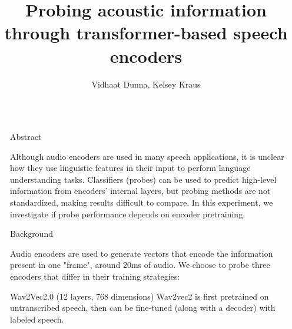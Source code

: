 \documentclass[final]{beamer}
\title{Probing acoustic information through transformer-based speech encoders}
\author{Vidhaat Dunna, Kelsey Kraus}
\institute[shortinst]{San José State University}
\newlength{\sepwidth}
\newlength{\colwidth}
\newcommand{\separatorcolumn}{\begin{column}{\sepwidth}\end{column}}
\begin{document}
\begin{frame}[t]
\begin{columns}[t]
\separatorcolumn

\begin{column}{\colwidth}

  \begin{block}{Abstract}

    Although audio encoders are used in many speech applications, it is unclear how they use linguistic features
    in their input to perform language understanding tasks. 
    Classifiers (probes) can be used to predict high-level information from encoders’ internal layers, but probing 
    methods are not standardized, making results difficult to compare. In this experiment, we investigate if probe
    performance depends on encoder pretraining.

  \end{block}

  \begin{block}{Background}

    Audio encoders are used to generate vectors that encode the information present in one "frame", around 20ms of 
    audio. We choose to probe three encoders that differ in their training strategies:

    \begin{alertblock}{Wav2Vec2.0 (12 layers, 768 dimensions)}
      Wav2vec2 is first pretrained on untranscribed speech, then can be fine-tuned (along with a decoder) with
      labeled speech.
      \par\noindent{}
\end{alertblock}
\end{block}
\end{column}
\end{columns}
\end{frame}
\end{document}
